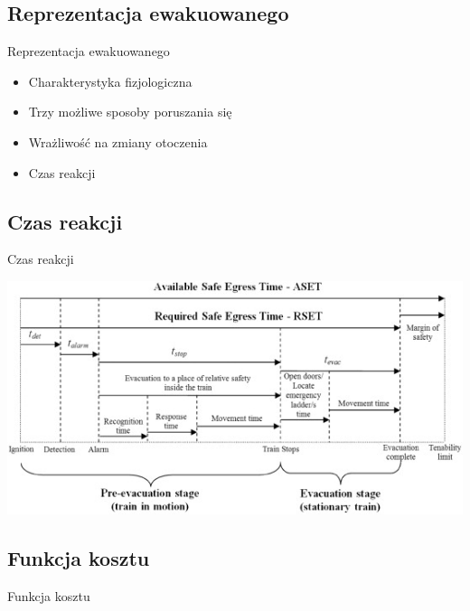 \subsection{Reprezentacja ewakuowanego}
\begin{frame}{Reprezentacja ewakuowanego}
\begin{itemize}
	\item Charakterystyka fizjologiczna
	\item Trzy możliwe sposoby poruszania się
	\item Wrażliwość na zmiany otoczenia
	\item Czas reakcji
\end{itemize}
\end{frame}

\subsection{Czas reakcji}
\begin{frame}{Czas reakcji}
\begin{center}	
	\includegraphics[keepaspectratio=true]{egress_time}
	\end{center}
\end{frame}

\subsection{Funkcja kosztu}
\begin{frame}{Funkcja kosztu}
\end{frame}
